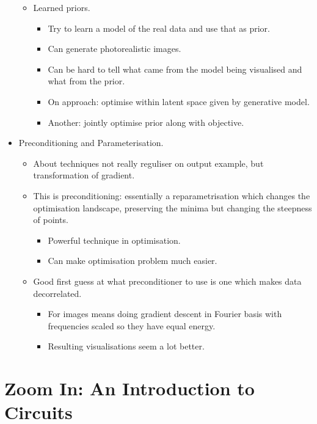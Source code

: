 \begin{itemize}
\begin{itemize}
\begin{itemize}
        \end{itemize}
        \item Learned priors.
        \begin{itemize}
            \item Try to learn a model of the real data and use that as prior.
            \item Can generate photorealistic images.
            \item Can be hard to tell what came from the model being visualised and what from the prior.
            \item On approach: optimise within latent space given by generative model.
            \item Another: jointly optimise prior along with objective.
        \end{itemize}
    \end{itemize}
    \item Preconditioning and Parameterisation.
    \begin{itemize}
        \item About techniques not really reguliser on output example, but transformation of gradient.
        \item This is preconditioning: essentially a reparametrisation which changes the optimisation landscape, preserving the minima but changing the steepness of points.
        \begin{itemize}
            \item Powerful technique in optimisation.
            \item Can make optimisation problem much easier.
        \end{itemize}
        \item Good first guess at what preconditioner to use is one which makes data decorrelated.
        \begin{itemize}
            \item For images means doing gradient descent in Fourier basis with frequencies scaled so they have equal energy.
            \item Resulting visualisations seem a lot better.
        \end{itemize}
    \end{itemize}
\end{itemize}


\section{Zoom In: An Introduction to Circuits}

